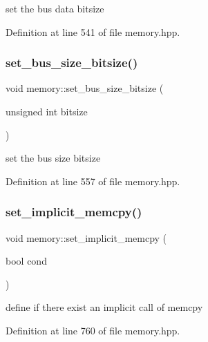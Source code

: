 set the bus data bitsize 



Definition at line 541 of file memory.\+hpp.

\mbox{\label{classmemory_a306423532042ca8f0effb744fc8f9931}} 
\subsubsection{\texorpdfstring{set\+\_\+bus\+\_\+size\+\_\+bitsize()}{set\_bus\_size\_bitsize()}}
{\footnotesize\ttfamily void memory\+::set\+\_\+bus\+\_\+size\+\_\+bitsize (\begin{DoxyParamCaption}\item[{unsigned int}]{bitsize }\end{DoxyParamCaption})\hspace{0.3cm}{\ttfamily [inline]}}



set the bus size bitsize 



Definition at line 557 of file memory.\+hpp.

\mbox{\label{classmemory_a685cd474a5a626474a519e9047866f78}} 
\subsubsection{\texorpdfstring{set\+\_\+implicit\+\_\+memcpy()}{set\_implicit\_memcpy()}}
{\footnotesize\ttfamily void memory\+::set\+\_\+implicit\+\_\+memcpy (\begin{DoxyParamCaption}\item[{bool}]{cond }\end{DoxyParamCaption})\hspace{0.3cm}{\ttfamily [inline]}}



define if there exist an implicit call of memcpy 



Definition at line 760 of file memory.\+hpp.

\mbox{\label{classmemory_a2a4b7aa0153f24a50385b370c260cec0}} 

